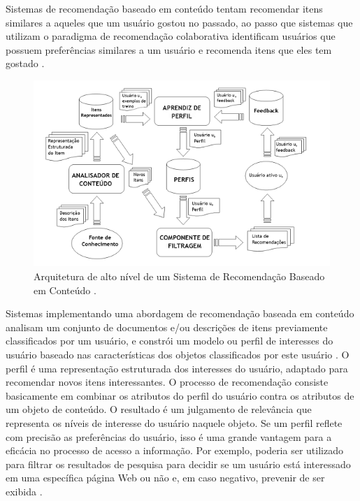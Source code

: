 Sistemas de recomendação baseado em conteúdo tentam recomendar itens similares a aqueles que um usuário gostou no passado, ao passo que sistemas que utilizam o paradigma de recomendação colaborativa identificam usuários que possuem preferências similares a um usuário e recomenda itens que eles tem gostado \citep{lops2011ContentBased}.

\begin{figure}
	\centering
	\includegraphics{imagens/content_based_architecture.png}
	\caption{Arquitetura de alto nível de um Sistema de Recomendação Baseado em Conteúdo \citep{lops2011ContentBased}.}
	\label{fig:content_based_architecture}
\end{figure} 

Sistemas implementando uma abordagem de recomendação baseada em conteúdo analisam um conjunto de documentos e/ou descrições de itens previamente classificados por um usuário, e constrói um modelo ou perfil de interesses do usuário baseado nas características dos objetos classificados por este usuário \citep{Mladenic:1999:TRI:630307.630472}. O perfil é uma representação estruturada dos interesses do usuário, adaptado para recomendar novos itens interessantes. O processo de recomendação consiste basicamente em combinar os atributos do perfil do usuário contra os atributos de um objeto de conteúdo. O resultado é um julgamento de relevância que representa os níveis de interesse do usuário naquele objeto. Se um perfil reflete com precisão as preferências do usuário, isso é uma grande vantagem para a eficácia no processo de acesso a informação. Por exemplo, poderia ser utilizado para filtrar os resultados de pesquisa para decidir se um usuário está interessado em uma específica página Web ou não e, em caso negativo, prevenir de ser exibida \citep{lops2011ContentBased}.

